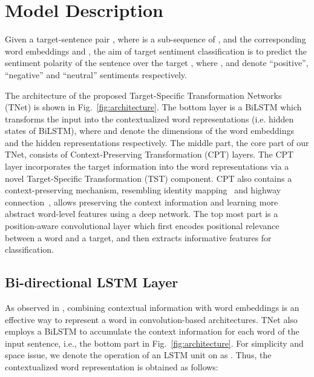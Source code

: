 \documentclass[11pt,a4paper]{article}
\begin{document}
\section{Model Description}
Given a target-sentence pair , where  is a sub-sequence of , and the corresponding word embeddings  and , the aim of target sentiment classification is to predict the sentiment polarity  of the sentence  over the target , where ,  and  denote ``positive'', ``negative'' and ``neutral'' sentiments respectively.

The architecture of the proposed Target-Specific Transformation Networks (TNet) is shown in Fig.~\ref{fig:architecture}. The bottom layer is a BiLSTM which transforms the input  into the contextualized word representations  (i.e. hidden states of BiLSTM), where  and  denote the dimensions of the word embeddings and the hidden representations respectively. The middle part, the core part of our TNet, consists of  Context-Preserving Transformation (CPT) layers. The CPT layer incorporates the target information into the word representations via a novel Target-Specific Transformation (TST) component. CPT also contains a context-preserving mechanism, resembling identity mapping~\cite{he2016deep,he2016identity} and highway connection~\cite{srivastava2015training,srivastava2015highway}, allows preserving the context information and learning more abstract word-level features using a deep network. The top most part is a position-aware convolutional layer which first encodes positional relevance between a word and a target, and then extracts informative features for classification.

\subsection{Bi-directional LSTM Layer}
\label{sec:2.2}
As observed in \citet{lai2015recurrent}, combining contextual information with word embeddings is an effective way to represent a word in convolution-based architectures. 
TNet also employs a BiLSTM to accumulate the context information for each word of the input sentence, i.e., the bottom part in Fig.~\ref{fig:architecture}. 
For simplicity and space issue, we denote the operation of an LSTM unit on  as .
Thus, the contextualized word representation  is obtained as follows:




\begin{comment}






    
The computation process of LSTM is below:


where ,  and  are learnable parameters of LSTM, and  is the length of the input sentence. For simplicity, we denote the above equation as  in the following sections. 

\end{comment}
\end{document}
